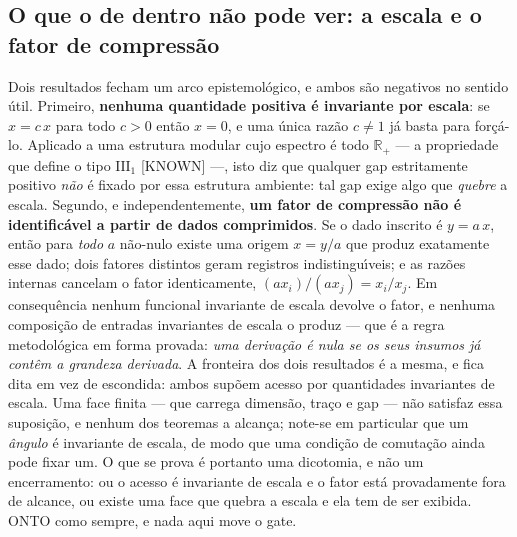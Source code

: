 \documentclass[11pt]{article}
\theoremstyle{definition}\newtheorem{deriv}{Derivação}
\begin{document}
\subsection*{O que o de dentro n\~ao pode ver: a escala e o fator de compress\~ao}Dois resultados fecham um arco epistemol\'ogico, e ambos s\~ao negativos no sentido \'util. Primeiro, \textbf{nenhuma quantidade positiva \'e invariante por escala}: se $x = c\,x$ para todo $c>0$ ent\~ao $x=0$, e uma \'unica raz\~ao $c\neq 1$ j\'a basta para for\c{c}\'a-lo. Aplicado a uma estrutura modular cujo espectro \'e todo $\mathbb{R}_+$ --- a propriedade que define o tipo $\mathrm{III}_1$ \textsf{[KNOWN]} ---, isto diz que qualquer gap estritamente positivo \emph{n\~ao} \'e fixado por essa estrutura ambiente: tal gap exige algo que \emph{quebre} a escala. Segundo, e independentemente, \textbf{um fator de compress\~ao n\~ao \'e identific\'avel a partir de dados comprimidos}. Se o dado inscrito \'e $y = a\,x$, ent\~ao para \emph{todo} $a$ n\~ao-nulo existe uma origem $x=y/a$ que produz exatamente esse dado; dois fatores distintos geram registros indistingu\'\i{}veis; e as raz\~oes internas cancelam o fator identicamente, $(a x_i)/(a x_j) = x_i/x_j$. Em consequ\^encia nenhum funcional invariante de escala devolve o fator, e nenhuma composi\c{c}\~ao de entradas invariantes de escala o produz --- que \'e a regra metodol\'ogica em forma provada: \emph{uma deriva\c{c}\~ao \'e nula se os seus insumos j\'a cont\^em a grandeza derivada}. A fronteira dos dois resultados \'e a mesma, e fica dita em vez de escondida: ambos sup\~oem acesso por quantidades invariantes de escala. Uma face finita --- que carrega dimens\~ao, tra\c{c}o e gap --- n\~ao satisfaz essa suposi\c{c}\~ao, e nenhum dos teoremas a alcan\c{c}a; note-se em particular que um \emph{\^angulo} \'e invariante de escala, de modo que uma condi\c{c}\~ao de comuta\c{c}\~ao ainda pode fixar um. O que se prova \'e portanto uma dicotomia, e n\~ao um encerramento: ou o acesso \'e invariante de escala e o fator est\'a provadamente fora de alcance, ou existe uma face que quebra a escala e ela tem de ser exibida. \textsf{ONTO} como sempre, e nada aqui move o gate.
\end{document}
